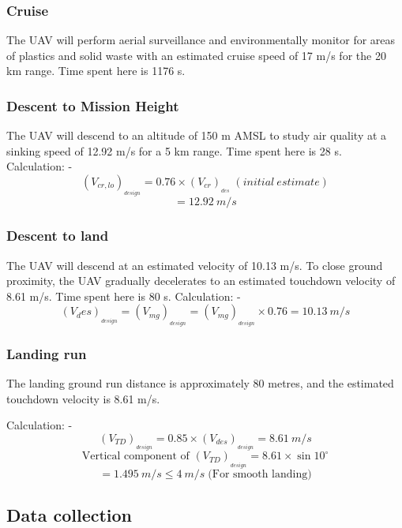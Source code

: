 \documentclass[12 pt]{article}
\begin{document}
\subsubsection{Cruise \cite{alhajjaji2017design}}
The UAV will perform aerial surveillance and environmentally monitor for areas of plastics and solid waste with an estimated cruise speed of 17 m/s for the 20 km range. Time spent here is 1176 s.

\subsubsection{Descent to Mission Height}
The UAV will descend to an altitude of 150 m AMSL to study air quality at a sinking speed of 12.92 m/s for a 5 km range. Time spent here is 28 s.\\

Calculation: - 
$$ (V_{cr,lo})_{_{design}} = 0.76 \times (V_{cr})_{_{des}} \;  (initial \: estimate) $$
$$ = 12.92 \: m/s $$

\subsubsection{Descent to land \cite{Anderson1}}
The UAV will descend at an estimated velocity of 10.13 m/s. To close ground proximity, the UAV gradually decelerates to an estimated touchdown velocity of 8.61 m/s. Time spent here is 80 s.
Calculation: - 
$$(V_des)_{_{design}} = (V_{mg})_{_{design}} = (V_{mg})_{_{design}} \times 0.76 = 10.13 \: m/s $$

\subsubsection{Landing run}
The landing ground run distance is approximately 80 metres, and the estimated touchdown velocity is 8.61 m/s.

Calculation: - 
$$ (V_{TD})_{_{design}} = 0.85 \times (V_{des})_{_{design}} = 8.61 \: m/s  $$
$$ \text{Vertical component of } (V_{TD})_{_{design}} = 8.61 \times \sin{10^{\circ}} $$
$$ = 1.495 \: m/s \leq 4 \: m/s \; \text{(For smooth landing)} $$



\subsection{Data collection}
\end{document}
